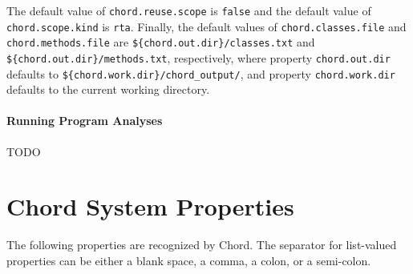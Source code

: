 \documentclass{article}
\begin{document}
The default value of \verb+chord.reuse.scope+ is \verb+false+ and the default value of \verb+chord.scope.kind+
is \verb+rta+.
Finally, the default values of \verb+chord.classes.file+ and \verb+chord.methods.file+ are
\verb+${chord.out.dir}/classes.txt+ and \verb+${chord.out.dir}/methods.txt+, respectively,
where property \verb+chord.out.dir+ defaults to \verb+${chord.work.dir}/chord_output/+,
and property \verb+chord.work.dir+ defaults to the current working directory.

\paragraph{Running Program Analyses}

TODO






\texonly{\newpage}
\section{Chord System Properties}
\label{sec-sys-props}

The following properties are recognized by Chord.
The separator for list-valued properties can be either a blank space, a comma, a colon, or a semi-colon.
\end{document}
